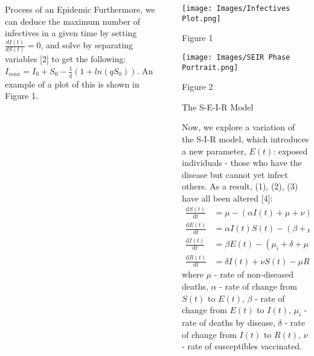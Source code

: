 \documentclass[final]{beamer}
\newlength{\sepwidth}
\newlength{\colwidth}
\newcommand{\separatorcolumn}{\begin{column}{\sepwidth}\end{column}}
\begin{document}
\begin{frame}[t]
\begin{columns}[t]
\begin{column}{\colwidth}
\begin{block}{Process of an Epidemic}
  Furthermore, we can deduce the maximum number of infectives in a given time by setting $\frac{\textit{d}I(t)}{\textit{d}S(t)} = 0$, and solve by separating variables [2] to get the following: $I_{max} = I_{0} + S_{0} - \frac{1}{q}(1 + ln(qS_{0}))$. An example of a plot of this is shown in Figure 1.

  

  \end{block}


\end{column}

\separatorcolumn

\begin{column}{\colwidth}
   
    \begin{minipage}{370pt}
        \vspace{1.5cm}
        \texttt{[image: Images/Infectives Plot.png]}
        \begin{center}
            \caption{\small Figure 1}
        \end{center}
    \end{minipage}
    \hspace{7cm}
    \begin{minipage}{335pt}
        \texttt{[image: Images/SEIR Phase Portrait.png]}
        \begin{center}
            \vspace{-0.5cm}
            \caption{\small Figure 2}
        \end{center}
    \end{minipage}



  \begin{block}{The S-E-I-R Model}

  Now, we explore a variation of the S-I-R model, which introduces a new parameter, $E(t)$: exposed individuals - those who have the disease but cannot yet infect others. As a result, (1), (2), (3) have all been altered [4]:
  \begin{align}
  \frac{\textrm{d}S(t)}{\textrm{d}t} &= \mu - (\alpha I(t) + \mu + \nu)S(t),\\
  \frac{\textrm{d}E(t)}{\textrm{d}t} &= \alpha I(t)S(t) - (\beta + \mu)E(t),\\
  \frac{\textrm{d}I(t)}{\textrm{d}t} &= \beta E(t) - (\mu_{i} + \delta + \mu)I(t),\\
  \frac{\textrm{d}R(t)}{\textrm{d}t} &= \delta I(t) + \nu S(t) - \mu R(t)
  \end{align}
  where $\mu$ - rate of non-diseased deaths, $\alpha$ - rate of change from $S(t)$ to $E(t)$, $\beta$ - rate of change from $E(t)$ to $I(t)$, $\mu_{i}$ - rate of deaths by disease, $\delta$ - rate of change from $I(t)$ to $R(t)$, $\nu$ - rate of susceptibles vaccinated.


\end{block}
\end{column}
\end{columns}
\end{frame}
\end{document}
